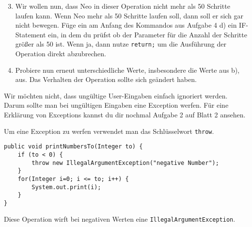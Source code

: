 \begin{enumerate}\setcounter{enumi}{2}
	\item
		Wir wollen nun, dass Neo in dieser Operation nicht mehr als 50 Schritte laufen kann.
		Wenn Neo mehr als 50 Schritte laufen soll, dann soll er sich gar nicht bewegen.
		Füge ein am Anfang des Kommandos aus Aufgabe 4 d) ein IF-Statement ein, in dem du prüfst ob der Parameter für die Anzahl der Schritte größer als 50 ist.
		Wenn ja, dann nutze \lstinline{return;} um die Ausführung der Operation direkt abzubrechen.

	\item
		Probiere nun erneut unterschiedliche Werte, insbesondere die Werte aus b), aus.
		Das Verhalten der Operation sollte sich geändert haben.
\end{enumerate}

\medskip %

\begin{Infobox}
	Wir möchten nicht, dass ungültige User-Eingaben einfach ignoriert werden.
	Darum sollte man bei ungültigen Eingaben eine Exception werfen.
	Für eine Erklärung von Exceptions kannst du dir nochmal Aufgabe 2 auf Blatt 2 ansehen.

	Um eine Exception zu werfen verwendet man das Schlüsselwort \lstinline{throw}.

	\begin{lstlisting}[xleftmargin=0.5cm]
public void printNumbersTo(Integer to) {
    if (to < 0) {
        throw new IllegalArgumentException("negative Number");
    }
    for(Integer i=0; i <= to; i++) {
        System.out.print(i);
    }
}
	\end{lstlisting}

	Diese Operation wirft bei negativen Werten eine \lstinline{IllegalArgumentException}.
\end{Infobox}


